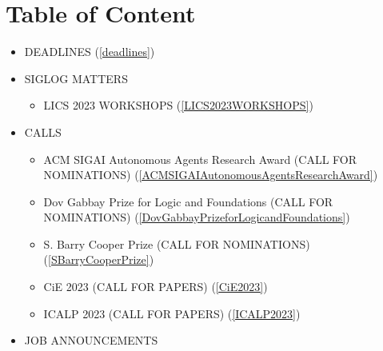 \documentclass[prodmode,acmtecs]{acmsmall} %
\begin{document}
\section{Table of Content}\begin{itemize}\item DEADLINES (\cref{deadlines}) 
 
\item SIGLOG MATTERS 
 
\begin{itemize}\item LICS 2023 WORKSHOPS (\cref{LICS2023WORKSHOPS})
\end{itemize} 
\item CALLS 
 
\begin{itemize}\item ACM SIGAI Autonomous Agents Research Award (CALL FOR NOMINATIONS) (\cref{ACMSIGAIAutonomousAgentsResearchAward})
\item Dov Gabbay Prize for Logic and Foundations (CALL FOR NOMINATIONS) (\cref{DovGabbayPrizeforLogicandFoundations})
\item S. Barry Cooper Prize (CALL FOR NOMINATIONS) (\cref{SBarryCooperPrize})
\item CiE 2023 (CALL FOR PAPERS) (\cref{CiE2023})
\item ICALP 2023 (CALL FOR PAPERS) (\cref{ICALP2023})
\end{itemize} 
\item JOB ANNOUNCEMENTS 
 

\end{itemize}
\end{document}
